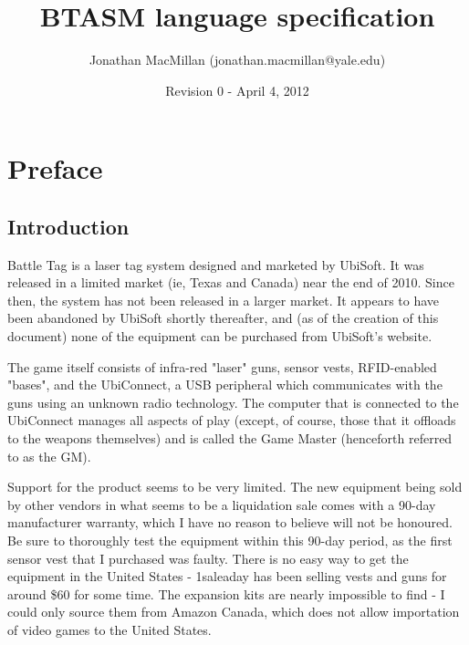 \documentclass[12pt]{scrbook}
\begin{document}
\title {BTASM language specification}
\date {Revision 0 - April 4, 2012}
\author {Jonathan MacMillan (jonathan.macmillan@yale.edu)}
\maketitle

\frontmatter
\setcounter{page}{1}
\tableofcontents


\chapter*{Preface}
\pagestyle{scrheadings}
\rohead{\thepage}
\lehead{\thepage}
\cfoot{}
\ofoot{}
\section*{Introduction}

Battle Tag is a laser tag system designed and marketed by UbiSoft.  It was released in a
limited market (ie, Texas and Canada) near the end of 2010.  Since then, the system has
not been released in a larger market.  It appears to have been abandoned by UbiSoft shortly
thereafter, and (as of the creation of this document) none of the equipment can be purchased
from UbiSoft's website.

The game itself consists of infra-red "laser" guns, sensor vests, RFID-enabled "bases", and
the UbiConnect, a USB peripheral which communicates with the guns using an unknown radio
technology.  The computer that is connected to the UbiConnect manages all aspects of play 
(except, of course, those that it offloads to the weapons themselves) and is called the Game
Master (henceforth referred to as the GM).

Support for the product seems to be very limited.  The new equipment being sold by other
vendors in what seems to be a liquidation sale comes with a 90-day manufacturer warranty, 
which I have no reason to believe will not be honoured.  Be sure to thoroughly test the
equipment within this 90-day period, as the first sensor vest that I purchased was faulty.
There is no easy way to get the equipment in the United States - 1saleaday has been selling
vests and guns for around \$60 for some time.  The expansion kits are nearly impossible
to find - I could only source them from Amazon Canada, which does not allow importation of
video games to the United States.  
\end{document}
